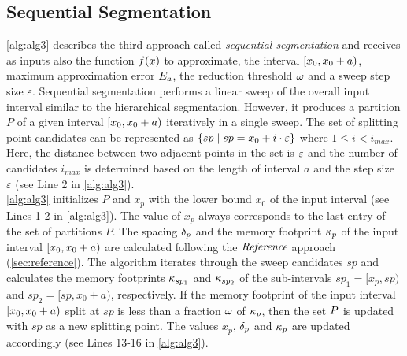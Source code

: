 \subsection{Sequential Segmentation} 
\cref{alg:alg3} describes the third approach called \textit{sequential segmentation} and receives as inputs also the function $f(x)$ to approximate, the interval $[x_{0}, x_{0}+a)$, maximum approximation error $E_a$, the reduction threshold $\omega$ and a sweep step size $\varepsilon$.
Sequential segmentation performs a linear sweep of the overall input interval similar to the hierarchical segmentation.
However, it produces a partition $P$ of a given interval $[x_{0}, x_{0}+a)$ iteratively in a single sweep.
The set of splitting point candidates can be represented as $\{sp \hspace{1mm}|\hspace{1mm}sp=x_0 + i \cdot \varepsilon\}$ where $1\leq i < i_{max}$.
Here, the distance between two adjacent points in the set is $\varepsilon$ and the number of candidates $i_{max}$ is determined based on the length of interval $a$ and the step size $\varepsilon$ (see Line 2 in \cref{alg:alg3}).\\
\cref{alg:alg3} initializes $P$ and $x_p$ with the lower bound $x_0$ of the input interval (see Lines 1-2 in \cref{alg:alg3}).
The value of $x_p$ always corresponds to the last entry of the set of partitions $P$. 
The spacing $\delta_{p}$ and the memory footprint $\kappa_{p}$ of the input interval $[x_{0},x_{0}+a)$ are calculated following the $\textit{Reference}$ approach (\cref{sec:reference}).
The algorithm iterates through the sweep candidates $sp$ and calculates the memory footprints $\kappa_{sp_1}$ and $\kappa_{sp_2}$ of the sub-intervals $sp_1=[x_p,sp)$ and $sp_2=[sp,x_0+a)$, respectively.
If the memory footprint of the input interval $[x_{0}, x_{0}+a)$ split at $sp$ is less than a fraction $\omega$ of $\kappa_{p}$, then the set $P$ is updated with $sp$ as a new splitting point.
The values $x_p$, $\delta_{p}$ and $\kappa_{p}$ are updated accordingly (see Lines 13-16 in \cref{alg:alg3}).
